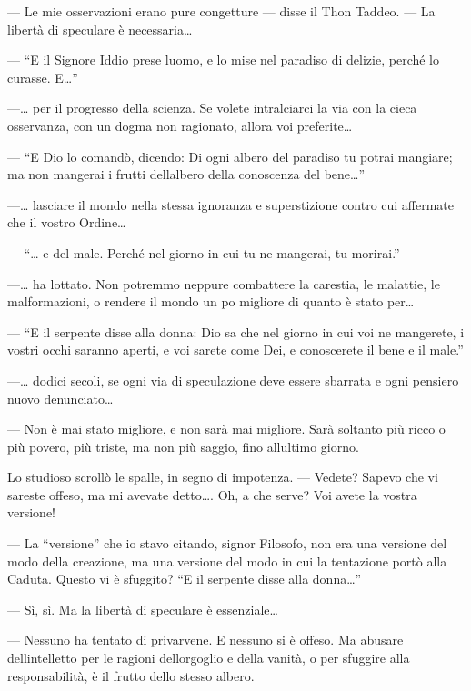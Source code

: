 --- Le mie osservazioni erano pure congetture --- disse il Thon Taddeo.
--- La libertà di speculare è necessaria\ldots{}

--- ``E il Signore Iddio prese l\textquotesingle uomo, e lo mise nel
paradiso di delizie, perché lo curasse. E\ldots''

---\ldots{} per il progresso della scienza. Se volete intralciarci la
via con la cieca osservanza, con un dogma non ragionato, allora voi
preferite\ldots{}

--- ``E Dio lo comandò, dicendo: Di ogni albero del paradiso tu potrai
mangiare; ma non mangerai i frutti dell\textquotesingle albero della
conoscenza del bene\ldots''

---\ldots{} lasciare il mondo nella stessa ignoranza e superstizione
contro cui affermate che il vostro Ordine\ldots{}

--- ``\ldots{} e del male. Perché nel giorno in cui tu ne mangerai, tu
morirai.''

---\ldots{} ha lottato. Non potremmo neppure combattere la carestia, le
malattie, le malformazioni, o rendere il mondo un po\textquotesingle{}
migliore di quanto è stato per\ldots{}

--- ``E il serpente disse alla donna: Dio sa che nel giorno in cui voi
ne mangerete, i vostri occhi saranno aperti, e voi sarete come Dei, e
conoscerete il bene e il male.''

---\ldots{} dodici secoli, se ogni via di speculazione deve essere
sbarrata e ogni pensiero nuovo denunciato\ldots{}

--- Non è mai stato migliore, e non sarà mai migliore. Sarà soltanto più
ricco o più povero, più triste, ma non più saggio, fino
all\textquotesingle ultimo giorno.

Lo studioso scrollò le spalle, in segno di impotenza. --- Vedete? Sapevo
che vi sareste offeso, ma mi avevate detto\ldots. Oh, a che serve? Voi
avete la vostra versione!

--- La ``versione'' che io stavo citando, signor Filosofo, non era una
versione del modo della creazione, ma una versione del modo in cui la
tentazione portò alla Caduta. Questo vi è sfuggito? ``E il serpente
disse alla donna\ldots''

--- Sì, sì. Ma la libertà di speculare è essenziale\ldots{}

--- Nessuno ha tentato di privarvene. E nessuno si è offeso. Ma abusare
dell\textquotesingle intelletto per le ragioni
dell\textquotesingle orgoglio e della vanità, o per sfuggire alla
responsabilità, è il frutto dello stesso albero.

